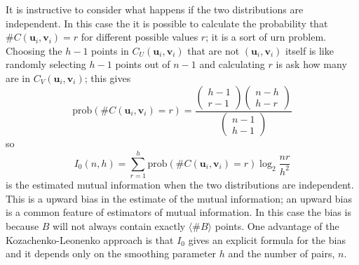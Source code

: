 \documentclass[12pt]{article}
\renewcommand{\u}{\mathbf{u}}
\renewcommand{\v}{\mathbf{v}}
\begin{document}
It is instructive to consider what happens if the two distributions are
independent. In this case the it is possible to calculate the
probability that $\#C(\u_i,\v_i)=r$ for different possible values $r$;
it is a sort of urn problem. 
%
Choosing the $h-1$ points in $C_U(\u_i,\v_i)$ that are not $(\u_i,\v_i)$ itself
is like randomly selecting $h-1$ points out of $n-1$ and calculating $r$ is ask how many
are in $C_V(\u_i,\v_i)$; this gives
\begin{equation}
\mbox{prob}\left(\#C(\u_i,\v_i)=r\right)=\frac{\left(\begin{array}{c}h-1\\r-1\end{array}\right)
\left(\begin{array}{c}n-h\\h-r\end{array}\right)}{\left(\begin{array}{c}n-1\\h-1\end{array}\right)}
\end{equation}
so
\begin{equation}
I_0(n,h)=\sum_{r=1}^h \mbox{prob}\left(\#C(\u_i,\v_i)=r\right) \log_2{\frac{nr}{h^2}}
\end{equation}
is the estimated mutual information when the two distributions are
independent. This is a upward bias in the estimate of the mutual
information; an upward bias is a common feature of estimators of
mutual information. In this case the bias is because $B$ will not
always contain exactly $\langle \#B\rangle$ points. One advantage of
the Kozachenko-Leonenko approach is that $I_0$ gives an explicit
formula for the bias and it depends only on the smoothing parameter
$h$ and the number of pairs, $n$.
\end{document}
